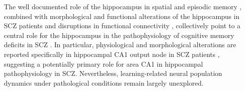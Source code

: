The well documented role of the hippocampus in spatial and episodic memory \citep{Burgess2002}\citep{Buzsaki2013}\citep{Dickerson2010}\citep{Eichenbaum2000}\citep{Eichenbaum2014}, combined with morphological and functional alterations of the hippocampus in SCZ patients \citep{Narr2004}\citep{Vita2006}\citep{Witthaus2010}\citep{Zhou2008}\citep{Heckers2010}\citep{Meyer-Lindenberg2005}\citep{Tamminga2010}\citep{Collin2011}\citep{Debbane2006}\citep{Flahault2012} and disruptions in functional connectivity \citep{Harrison2001}\citep{Hutcheson2015}, collectively point to a central role for the hippocampus in the pathophysiology of cognitive memory deficits in SCZ \citep{Achim2005}\citep{Bast2011}. In particular, physiological and morphological alterations are reported specifically in hippocampal CA1 output node in SCZ patients \citep{Narr2004}\citep{Zierhut2013}, suggesting a potentially primary role for area CA1 in hippocampal pathophysiology in SCZ. Nevertheless, learning-related neural population dynamics under pathological conditions remain largely unexplored.

